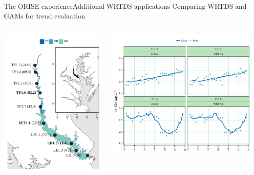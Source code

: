 \documentclass[serif]{beamer}\usepackage[]{graphicx}\usepackage[]{color}
\begin{document}
\begin{frame}{The ORISE experience}{Additional WRTDS applications}
Comparing WRTDS and GAMs for trend evaluation {\footnotesize \cite{Beck17}}
\begin{columns}
\begin{column}{0.38\textwidth}
\includegraphics[width = \textwidth]{fig/patux_map.pdf}
\end{column}
\begin{column}{0.65\textwidth}
\includegraphics[width = \textwidth]{fig/predann.pdf}

\end{column}
\end{columns}
\end{frame}
\end{document}
